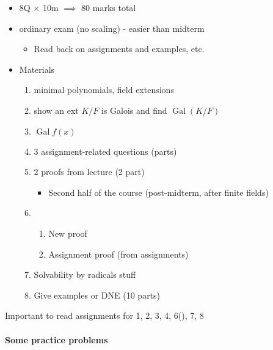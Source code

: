 \documentclass[notoc,notitlepage,nobib]{tufte-book}
\DeclareMathOperator{\Gal}{Gal}
\begin{document}
\begin{itemize}
  \item 8Q $\times$ 10m $\implies$ 80 marks total
  \item ordinary exam (no scaling) - easier than midterm
    \begin{itemize}
      \item Read back on assignments and examples, etc.
    \end{itemize}
  \item Materials
    \begin{enumerate}
      \item minimal polynomials, field extensions
      \item show an ext $K / F$ is Galois and find $\Gal(K / F)$
      \item $\Gal f(x)$
      \item 3 assignment-related questions (parts)
      \item 2 proofs from lecture (2 part)
        \begin{itemize}
          \item Second half of the course (post-midterm, after finite fields)
        \end{itemize}
      \item \begin{enumerate}
          \item New proof
          \item Assignment proof (from assignments)
        \end{enumerate}
      \item Solvability by radicals stuff
      \item Give examples or DNE (10 parts)
    \end{enumerate}
\end{itemize}

Important to read assignments for 1, 2, 3, 4, 6(\faStar), 7, 8

\paragraph{Some practice problems}
\end{document}
